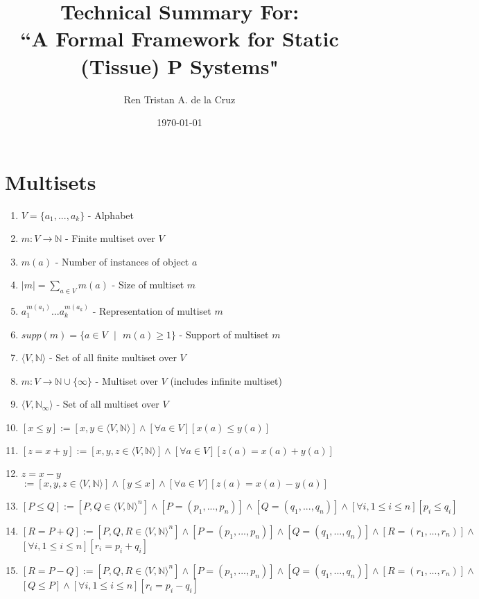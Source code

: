 \documentclass{article}
\title{Technical Summary For: \\ ``A Formal Framework for Static (Tissue) P Systems"}
\date{\today}
\author{Ren Tristan A. de la Cruz}
\newcommand{\s}{\text{ }}
\newcommand{\la}{\langle}
\newcommand{\ra}{\rangle}
\begin{document}
\maketitle

\section{Multisets}

\begin{enumerate}
   \item $V=\{a_1,...,a_k\}$ - Alphabet
   \item $m:V \rightarrow \mathbb{N}$ - Finite multiset over $V$
   \item $m(a)$ - Number of instances of object $a$
   \item $|m| = \sum_{a \in V} m(a)$ - Size of multiset $m$
   \item $a_1^{m(a_1)}...a_k^{m(a_k)}$ - Representation of multiset $m$
   \item $supp(m) = \{a \in V\s |\s m(a) \geq 1\}$ - Support of multiset $m$
   \item $\langle V, \mathbb{N}\rangle$ - Set of all finite multiset over $V$
   \item $m: V \rightarrow \mathbb{N} \cup \{\infty\}$ - Multiset over $V$ (includes infinite
         multiset) 
   \item $\langle V, \mathbb{N}_{\infty} \rangle$ - Set of all multiset over $V$
   \item $[x \leq y] := [x,y \in \la V, \mathbb{N} \ra] \land [\forall a\in V][x(a) \leq y(a)] $
   \item $[z = x + y]:= [x,y,z \in \la V,\mathbb{N} \ra] \land [\forall a\in V][z(a) = x(a) + y(a)]$
   \item $z = x - y$ $:= [x,y,z \in \la V, \mathbb{N} \ra] \land [y\leq x] \land [\forall a\in V] 
         [z(a) = x(a) - y(a)]$
   \item $[P \leq Q] :=  [P,Q \in \la V, \mathbb{N} \ra^n] \land [P=(p_1,...,p_n)] \land 
         [Q=(q_1,...,q_n)] \land [\forall i, 1 \leq i \leq n] [p_i \leq q_i]$
   \item $[R = P + Q] :=  [P,Q,R \in \la V, \mathbb{N} \ra^n] \land [P=(p_1,...,p_n)] \land 
         [Q=(q_1,...,q_n)] \land [R=(r_1,...,r_n)] \land $ \\ $[\forall i, 1 \leq i \leq n] 
         [r_i = p_i + q_i]$
   \item $[R = P - Q] :=  [P,Q,R \in \la V, \mathbb{N} \ra^n] \land [P=(p_1,...,p_n)] \land 
         [Q=(q_1,...,q_n)] \land [R=(r_1,...,r_n)] \land $ \\ $[Q \leq P] \land 
         [\forall i, 1 \leq i \leq n] [r_i = p_i - q_i]$
\end{enumerate}
\end{document}
